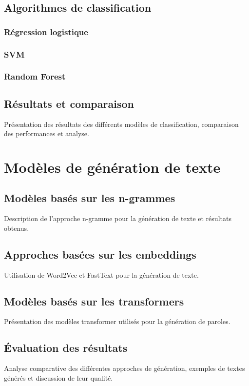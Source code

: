 \documentclass[a4paper,11pt]{article}
\begin{document}
\subsection{Algorithmes de classification}
\subsubsection{Régression logistique}
\subsubsection{SVM}
\subsubsection{Random Forest}

\subsection{Résultats et comparaison}
Présentation des résultats des différents modèles de classification, comparaison des performances et analyse.

\section{Modèles de génération de texte}
\label{sec:generation}

\subsection{Modèles basés sur les n-grammes}
Description de l'approche n-gramme pour la génération de texte et résultats obtenus.

\subsection{Approches basées sur les embeddings}
Utilisation de Word2Vec et FastText pour la génération de texte.

\subsection{Modèles basés sur les transformers}
Présentation des modèles transformer utilisés pour la génération de paroles.

\subsection{Évaluation des résultats}
Analyse comparative des différentes approches de génération, exemples de textes générés et discussion de leur qualité.
\end{document}

